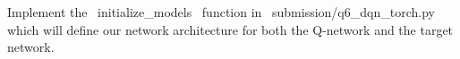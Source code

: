 \item {}
Implement the ~initialize_models~ function in ~submission/q6_dqn_torch.py~ which will define our network architecture for both the Q-network and the target network.